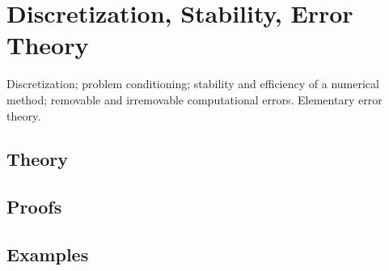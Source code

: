 
\section{Discretization, Stability, Error Theory}
\label{sec:2.1.05-discretization-stability}

\begin{ticket}
Discretization; problem conditioning; stability and efficiency of a numerical method; removable and irremovable computational errors. Elementary error theory.
\end{ticket}

\subsection*{Theory}

\subsection*{Proofs}

\subsection*{Examples}
